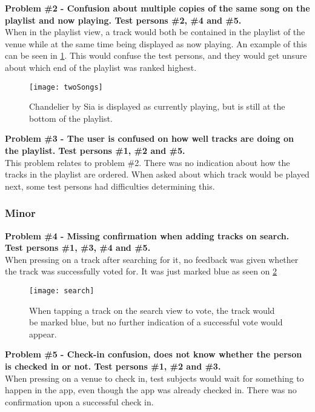 \noindent\textbf{Problem \#2 - Confusion about multiple copies of the same song on the playlist and now playing. Test persons \#2, \#4 and \#5.}\\
When in the playlist view, a track would both be contained in the playlist of the venue while at the same time being displayed as now playing. An example of this can be seen in \cref{fig:twoSongs}. This would confuse the test persons, and they would get unsure about which end of the playlist was ranked highest.\\

\begin{figure}[hbtp]
  \centering
  \texttt{[image: twoSongs]}
  \caption{Chandelier by Sia is displayed as currently playing, but is still at the bottom of the playlist.}\label{fig:twoSongs}
\end{figure}

\noindent\textbf{Problem \#3 - The user is confused on how well tracks are doing on the playlist. Test persons \#1, \#2 and \#5.}\\
This problem relates to problem \#2. There was no indication about how the tracks in the playlist are ordered. When asked about which track would be played next, some test persons had difficulties determining this.\\

\subsubsection{Minor}
\textbf{Problem \#4 - Missing confirmation when adding tracks on search. Test persons \#1, \#3, \#4 and \#5.}\\
When pressing on a track after searching for it, no feedback was given whether the track was successfully voted for. It was just marked blue as seen on \cref{fig:search}\\

\begin{figure}[hbtp]
  \centering
  \texttt{[image: search]}
  \caption{When tapping a track on the search view to vote, the track
    would be marked blue, but no further indication of a successful
    vote would appear.}\label{fig:search}
\end{figure}

\noindent\textbf{Problem \#5 - Check-in confusion, does not know whether the person is checked
    in or not. Test persons \#1, \#2 and \#3.}\\
  When pressing on a venue to check in, test subjects would wait for
  something to happen in the app, even though the app was already
  checked in. There was no confirmation upon a successful check in.\\

